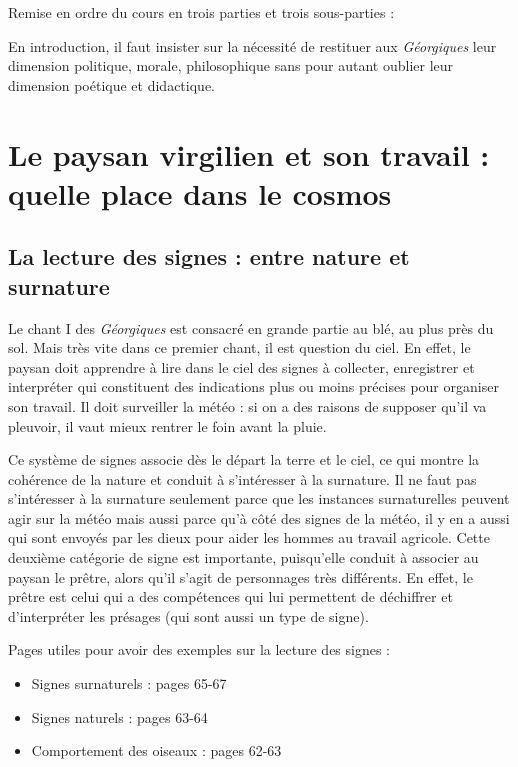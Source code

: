 \documentclass[a4paper,12pt]{book}
\begin{document}
\par Remise en ordre du cours en trois parties et trois sous-parties :
\par En introduction, il faut insister sur la nécessité de restituer aux \textit{Géorgiques} leur dimension politique, morale, philosophique sans pour autant oublier leur dimension poétique et didactique.
\section{Le paysan virgilien et son travail : quelle place dans le cosmos}
\subsection{La lecture des signes : entre nature et surnature}
Le chant I des \textit{Géorgiques} est consacré en grande partie au blé, au plus près du sol. Mais très vite dans ce premier chant, il est question du ciel. En effet, le paysan doit apprendre à lire dans le ciel des signes à collecter, enregistrer et interpréter qui constituent des indications plus ou moins précises pour organiser son travail. Il doit surveiller la météo : si on a des raisons de supposer qu'il va pleuvoir, il vaut mieux rentrer le foin avant la pluie.
\par Ce système de signes associe dès le départ la terre et le ciel, ce qui montre la cohérence de la nature et conduit à s'intéresser à la surnature. Il ne faut pas s'intéresser à la surnature seulement parce que les instances surnaturelles peuvent agir sur la météo mais aussi parce qu'à côté des signes de la météo, il y en a aussi qui sont envoyés par les dieux pour aider les hommes au travail agricole. Cette deuxième catégorie de signe est importante, puisqu'elle conduit à associer au paysan le prêtre, alors qu'il s'agit de personnages très différents. En effet, le prêtre est celui qui a des compétences qui lui permettent de déchiffrer et d'interpréter les présages (qui sont aussi un type de signe).
\par Pages utiles pour avoir des exemples sur la lecture des signes :\begin{itemize}
\item Signes surnaturels : pages 65-67
\item Signes naturels : pages 63-64
\item Comportement des oiseaux : pages 62-63
\end{itemize}
\end{document}
